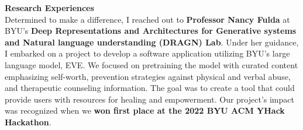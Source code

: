 \documentclass{article}
\begin{document}
\textbf{Research Experiences}\\
Determined to make a difference, I reached out to \textbf{Professor Nancy Fulda} at BYU's \textbf{Deep Representations and Architectures for Generative systems and Natural language understanding (DRAGN) Lab}. Under her guidance, I embarked on a project to develop a software application utilizing BYU's large language model, EVE. We focused on pretraining the model with curated content emphasizing self-worth, prevention strategies against physical and verbal abuse, and therapeutic counseling information. The goal was to create a tool that could provide users with resources for healing and empowerment. Our project's impact was recognized when we \textbf{won first place at the 2022 BYU ACM YHack Hackathon}.
\\
\end{document}
